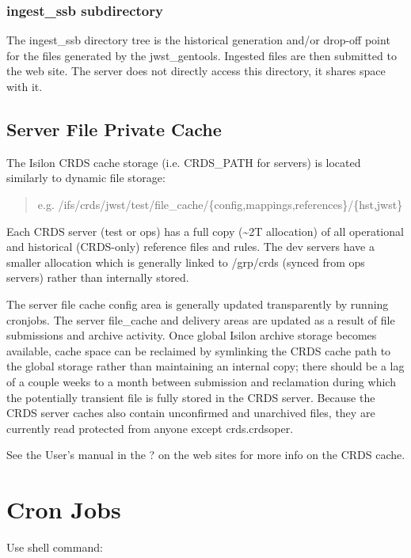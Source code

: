 \documentclass[letterpaper,10pt,english]{sphinxmanual}
\begin{document}
\subsection{ingest\_ssb subdirectory}
\label{server_guide:ingest-ssb-subdirectory}
The ingest\_ssb directory tree is the historical generation and/or drop-off point for the files generated by the
jwst\_gentools.   Ingested files are then submitted to the web site.   The server does not directly access this
directory,  it shares space with it.


\section{Server File Private Cache}
\label{server_guide:server-file-private-cache}
The Isilon CRDS cache storage (i.e. CRDS\_PATH for servers) is located similarly to dynamic file storage:
\begin{quote}

e.g. /ifs/crds/jwst/test/file\_cache/\{config,mappings,references\}/\{hst,jwst\}
\end{quote}

Each CRDS server (test or ops) has a full copy (\textasciitilde{}2T allocation) of all operational and historical (CRDS-only)
reference files and rules. The dev servers have a smaller allocation which is generally linked to /grp/crds
(synced from ops servers) rather than internally stored.

The server file cache config area is generally updated transparently by running cronjobs.   The server file\_cache
and delivery areas are updated as a result of file submissions and archive activity.  Once global Isilon archive storage
becomes available, cache space can be reclaimed by symlinking the CRDS cache path to the global storage rather than
maintaining an internal copy;  there should be a lag of a couple weeks to a month between submission and reclamation
during which the potentially transient file is fully stored in the CRDS server.   Because the CRDS server caches also
contain unconfirmed and unarchived files,  they are currently read protected from anyone except crds.crdsoper.

See the User's manual in the ? on the web sites for more info on the CRDS cache.


\chapter{Cron Jobs}
\label{server_guide:cron-jobs}
Use shell command:
\end{document}
